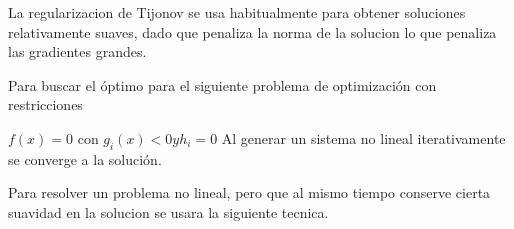 La regularizacion de Tijonov se usa habitualmente para obtener soluciones relativamente suaves, dado que penaliza la norma de la solucion lo que penaliza las gradientes grandes.

Para buscar el óptimo para el siguiente problema de optimización con
restricciones

$f(x)=0$ con $g_i(x) < 0 y h_i=0$ Al generar un sistema no lineal
iterativamente se converge a la solución.

Para resolver un problema no lineal, pero que al mismo tiempo conserve cierta suavidad en la solucion se usara la siguiente tecnica.


